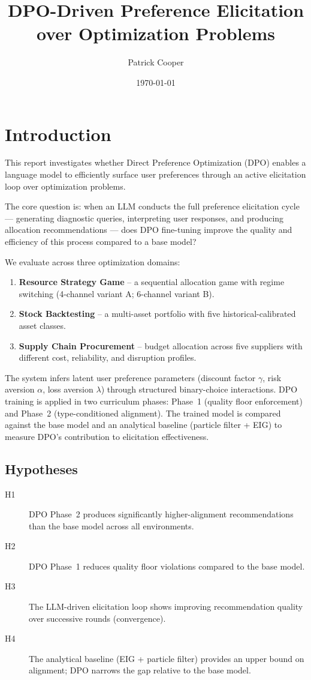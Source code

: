 \documentclass[11pt]{article}
\title{DPO-Driven Preference Elicitation over Optimization Problems}
\author{Patrick Cooper}
\date{\today}
\begin{document}
\maketitle

\section{Introduction}

This report investigates whether Direct Preference Optimization (DPO) enables
a language model to efficiently surface user preferences through an active
elicitation loop over optimization problems.

The core question is: when an LLM conducts the full preference elicitation
cycle --- generating diagnostic queries, interpreting user responses, and
producing allocation recommendations --- does DPO fine-tuning improve the
quality and efficiency of this process compared to a base model?

We evaluate across three optimization domains:
\begin{enumerate}
  \item \textbf{Resource Strategy Game} -- a sequential allocation game with
    regime switching (4-channel variant A; 6-channel variant B).
  \item \textbf{Stock Backtesting} -- a multi-asset portfolio with five
    historical-calibrated asset classes.
  \item \textbf{Supply Chain Procurement} -- budget allocation across five
    suppliers with different cost, reliability, and disruption profiles.
\end{enumerate}

The system infers latent user preference parameters
(discount factor $\gamma$, risk aversion $\alpha$, loss aversion $\lambda$)
through structured binary-choice interactions. DPO training is applied in two
curriculum phases: Phase~1 (quality floor enforcement) and Phase~2
(type-conditioned alignment). The trained model is compared against the base
model and an analytical baseline (particle filter + EIG) to measure DPO's
contribution to elicitation effectiveness.

\subsection{Hypotheses}

\begin{description}
  \item[H1] DPO Phase~2 produces significantly higher-alignment recommendations
    than the base model across all environments.
  \item[H2] DPO Phase~1 reduces quality floor violations compared to the base
    model.
  \item[H3] The LLM-driven elicitation loop shows improving recommendation
    quality over successive rounds (convergence).
  \item[H4] The analytical baseline (EIG + particle filter) provides an upper
    bound on alignment; DPO narrows the gap relative to the base model.
\end{description}
\end{document}
